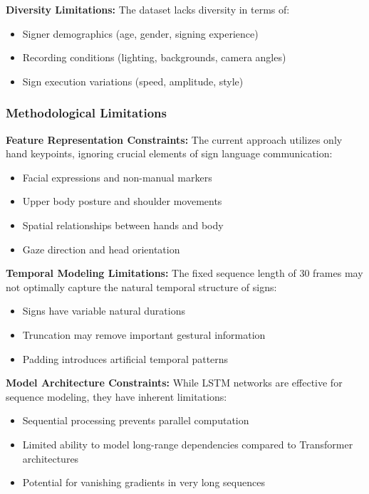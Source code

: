\documentclass[11pt, a4paper]{article}
\begin{document}
\textbf{Diversity Limitations:}
The dataset lacks diversity in terms of:
\begin{itemize}
    \item Signer demographics (age, gender, signing experience)
    \item Recording conditions (lighting, backgrounds, camera angles)
    \item Sign execution variations (speed, amplitude, style)
\end{itemize}

\subsubsection{Methodological Limitations}

\textbf{Feature Representation Constraints:}
The current approach utilizes only hand keypoints, ignoring crucial elements of sign language communication:
\begin{itemize}
    \item Facial expressions and non-manual markers
    \item Upper body posture and shoulder movements
    \item Spatial relationships between hands and body
    \item Gaze direction and head orientation
\end{itemize}

\textbf{Temporal Modeling Limitations:}
The fixed sequence length of 30 frames may not optimally capture the natural temporal structure of signs:
\begin{itemize}
    \item Signs have variable natural durations
    \item Truncation may remove important gestural information
    \item Padding introduces artificial temporal patterns
\end{itemize}

\textbf{Model Architecture Constraints:}
While LSTM networks are effective for sequence modeling, they have inherent limitations:
\begin{itemize}
    \item Sequential processing prevents parallel computation
    \item Limited ability to model long-range dependencies compared to Transformer architectures
    \item Potential for vanishing gradients in very long sequences
\end{itemize}
\end{document}
